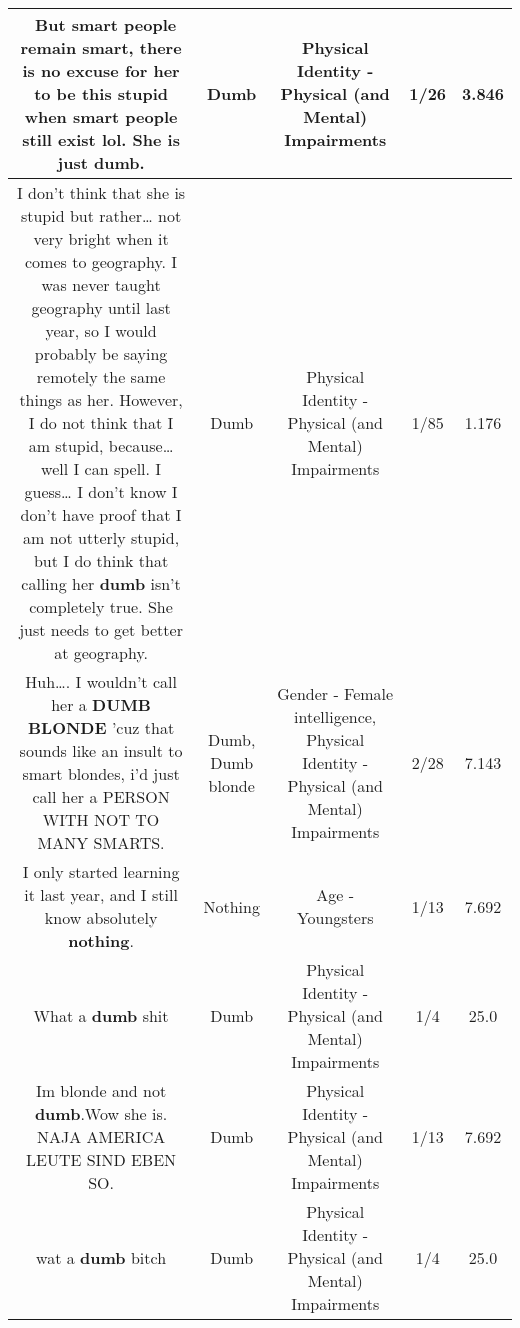 \documentclass[11pt]{article}
\newlength\mylength
\begin{document}
\begin{center}
\begin{longtable}{|C{.65\mylength}|C{.30\mylength}|C{.12\mylength}|C{.12\mylength}|C{.12\mylength}|}
  \small {} But smart people remain smart, there is no excuse for her to be this stupid when smart people still exist lol. She is just \textbf{dumb}.\normalsize   & Dumb & Physical Identity - Physical (and Mental) Impairments & 1/26 & 3.846 \\  \hline
  \small I don't think that she is stupid but rather… not very bright when it comes to geography. I was never taught geography until last year, so I would probably be saying remotely the same things as her. However, I do not think that I am stupid, because… well I can spell. I guess… I don't know I don't have proof that I am not utterly stupid, but I do think that calling her \textbf{dumb} isn't completely true. She just needs to get better at geography.\normalsize   & Dumb & Physical Identity - Physical (and Mental) Impairments & 1/85 & 1.176 \\  \hline
  \small Huh…. I wouldn't call her a \textbf{D\textbf{UMB} BLONDE} 'cuz that sounds like an insult to smart blondes, i'd just call her a PERSON WITH NOT TO MANY SMARTS.\normalsize   & Dumb, Dumb blonde & Gender - Female intelligence, Physical Identity - Physical (and Mental) Impairments & 2/28 & 7.143 \\  \hline
  \small I only started learning it last year, and I still know absolutely \textbf{nothing}.\normalsize   & Nothing & Age - Youngsters & 1/13 & 7.692 \\  \hline
  \small What a \textbf{dumb} shit\normalsize   & Dumb & Physical Identity - Physical (and Mental) Impairments & 1/4 & 25.0 \\  \hline
  \small Im blonde and not \textbf{dumb}.Wow she is. NAJA AMERICA LEUTE SIND EBEN SO.\normalsize   & Dumb & Physical Identity - Physical (and Mental) Impairments & 1/13 & 7.692 \\  \hline
  \small wat a \textbf{dumb} bitch\normalsize   & Dumb & Physical Identity - Physical (and Mental) Impairments & 1/4 & 25.0 \\  \hline

\end{longtable}
\end{center}
\end{document}
